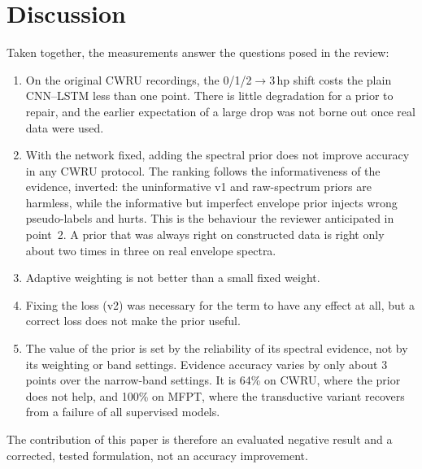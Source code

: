 \documentclass[conference]{IEEEtran}
\begin{document}
\section{Discussion}
\label{sec:discussion}
Taken together, the measurements answer the questions posed in the review:
\begin{enumerate}
\item On the original CWRU recordings, the 0/1/2$\to$3\,hp shift costs the
plain CNN--LSTM less than one point. There is little degradation for a prior
to repair, and the earlier expectation of a large drop was not borne out once
real data were used.
\item With the network fixed, adding the spectral prior does not improve accuracy
in any CWRU protocol. The ranking follows the informativeness of the evidence,
inverted: the uninformative v1 and raw-spectrum priors are harmless, while the
informative but imperfect envelope prior injects wrong pseudo-labels and hurts.
This is the behaviour the reviewer anticipated in point~2. A prior that was
always right on constructed data is right only about two times in three on real
envelope spectra.
\item Adaptive weighting is not better than a small fixed weight.
\item Fixing the loss (v2) was necessary for the term to have any effect at all,
but a correct loss does not make the prior useful.
\item The value of the prior is set by the reliability of its spectral
evidence, not by its weighting or band settings. Evidence accuracy varies by
only about 3 points over the narrow-band settings. It is 64\% on CWRU, where the
prior does not help, and 100\% on MFPT, where the transductive variant recovers
from a failure of all supervised models.
\end{enumerate}
The contribution of this paper is therefore an evaluated negative result and a
corrected, tested formulation, not an accuracy improvement.
\end{document}
